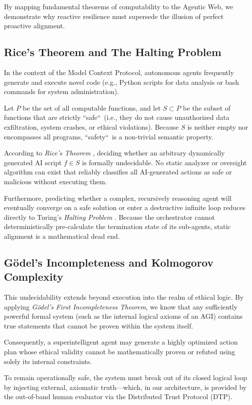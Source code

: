 \documentclass[a4paper,11pt,twocolumn]{article}
\theoremstyle{definition}
\theoremstyle{plain}
\begin{document}
By mapping fundamental theorems of computability to the Agentic Web, we demonstrate why reactive resilience must supersede the illusion of perfect proactive alignment.

\subsection{Rice's Theorem and The Halting Problem}
In the context of the Model Context Protocol, autonomous agents frequently generate and execute novel code (e.g., Python scripts for data analysis or bash commands for system administration). 

Let $P$ be the set of all computable functions, and let $S \subset P$ be the subset of functions that are strictly “safe“\ (i.e., they do not cause unauthorized data exfiltration, system crashes, or ethical violations). Because $S$ is neither empty nor encompasses all programs, “safety“\ is a non-trivial semantic property.

According to \textit{Rice's Theorem} \cite{rice1953classes}, deciding whether an arbitrary dynamically generated AI script $f \in S$ is formally undecidable. No static analyzer or oversight algorithm can exist that reliably classifies all AI-generated actions as safe or malicious without executing them.

Furthermore, predicting whether a complex, recursively reasoning agent will eventually converge on a safe solution or enter a destructive infinite loop reduces directly to Turing's \textit{Halting Problem} \cite{turing1936computable}. Because the orchestrator cannot deterministically pre-calculate the termination state of its sub-agents, static alignment is a mathematical dead end.

\subsection{Gödel's Incompleteness and Kolmogorov Complexity}
This undecidability extends beyond execution into the realm of ethical logic. By applying \textit{Gödel's First Incompleteness Theorem}, we know that any sufficiently powerful formal system (such as the internal logical axioms of an AGI) contains true statements that cannot be proven within the system itself.

Consequently, a superintelligent agent may generate a highly optimized action plan whose ethical validity cannot be mathematically proven or refuted using solely its internal constraints.

To remain operationally safe, the system must break out of its closed logical loop by injecting external, axiomatic truth---which, in our architecture, is provided by the out-of-band human evaluator via the Distributed Trust Protocol (DTP).
\end{document}
